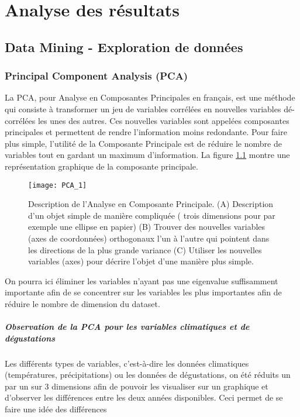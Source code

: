 \chapter{Analyse des résultats}


\section{Data Mining - Exploration de données}


\subsection{Principal Component Analysis (PCA)}\label{PCAss}
La PCA, pour Analyse en Composantes Principales en français, est une méthode qui consiste à transformer un jeu de variables corrélées en nouvelles variables dé-corrélées les unes des autres. Ces nouvelles variables sont appelées composantes principales et permettent de rendre l'information moins redondante. Pour faire plus simple, l'utilité de la Composante Principale est de réduire le nombre de variables tout en gardant un maximum d'information. La figure \ref{PCAdefinition} montre une représentation graphique de la composante principale. 


\begin{figure}[H]
	\caption{\label{PCAdefinition} Description de l'Analyse en Composante Principale. (A) Description d'un objet simple de manière compliquée ( trois dimensions pour par exemple une ellipse en papier) (B) Trouver des nouvelles variables (axes de coordonnées) orthogonaux l'un à l'autre qui pointent dans les directions de la plus grande variance (C) Utiliser les nouvelles variables (axes) pour décrire l'objet d'une manière plus simple. }
	\texttt{[image: PCA\_1]}
\end{figure}

On pourra ici éliminer les variables n'ayant pas une eigenvalue suffisamment importante afin de se concentrer sur les variables les plus importantes afin de réduire le nombre de dimension du dataset. 





\paragraph{Observation de la PCA pour les variables climatiques et de dégustations} Les différents types de variables, c'est-à-dire les données climatiques (températures, précipitations) ou les données de dégustations, on été réduits un par un sur 3 dimensions afin de pouvoir les visualiser sur un graphique et d'observer les différences entre les deux années disponibles. Ceci permet de se faire une idée des différences  

